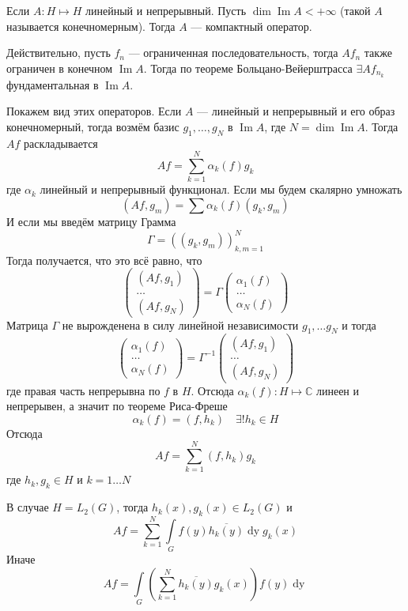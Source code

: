 \documentclass[12pt]{article}
\renewcommand{\Im}{\operatorname{Im}}
\begin{document}
\begin{Prim}
    Если $A : H \mapsto H$ линейный и непрерывный.
    Пусть $\dim \Im A < +\infty$ (такой $A$ называется конечномерным).
    Тогда $A$ --- компактный оператор.
    
    Действительно, пусть $f_n$ --- ограниченная последовательность, тогда
    $A f_n$ также ограничен в конечном $\Im A$.
    Тогда по теореме Больцано-Вейерштрасса $\exists A f_{n_k}$ фундаментальная
    в $\Im A$.
    
    Покажем вид этих операторов.
    Если $A$ --- линейный и непрерывный и его образ конечномерный, тогда возмём
    базис $g_1, \dots, g_N$ в $\Im A$, где $N = \dim \Im A$.
    Тогда $Af$ раскладывается
    $$
    Af = \sum\limits_{k = 1}^N\alpha_k(f)g_k
    $$
    где $\alpha_k$ линейный и непрерывный функционал.
    Если мы будем скалярно умножать
    $$
    (Af, g_m) = \sum \alpha_k(f) (g_k, g_m)
    $$
    И если мы введём матрицу Грамма
    $$
    \Gamma = ((g_k, g_m))_{k,m=1}^N
    $$
    Тогда получается, что это всё равно, что
    $$
    \left(
        \begin{array}{c}
            (Af, g_1)\\
            \dots\\
            (Af, g_N)
        \end{array}
    \right)
    =
    \Gamma \left(
        \begin{array}{c}
            \alpha_1(f)\\
            \dots\\
            \alpha_N(f)
        \end{array}
        \right)
    $$
    Матрица $\Gamma$ не вырожденена в силу линейной независимости 
    $g_1, \dots g_N$ и тогда
    $$
    \left(
        \begin{array}{c}
            \alpha_1(f)\\
            \dots\\
            \alpha_N(f)
        \end{array}
    \right)
    =
    \Gamma^{-1}\left(
        \begin{array}{c}
            (Af, g_1)\\
            \dots\\
            (Af, g_N)
        \end{array}
    \right)
    $$
    где правая часть непрерывна по $f$ в $H$.
    Отсюда $\alpha_k(f) : H \mapsto \mathbb C$ линеен и непрерывен, а значит
    по теореме Риса-Фреше
    $$
    \alpha_k(f) = (f, h_k)\quad \exists! h_k \in H
    $$
    Отсюда
    $$
    Af = \sum\limits_{k = 1}^N(f, h_k)g_k
    $$
    где $h_k, g_k \in H$ и $k = 1 \dots N$
\end{Prim}
\begin{Prim}
    В случае $H = L_2(G)$, тогда $h_k(x), g_k(x) \in L_2(G)$ и
    $$
    Af = \sum\limits_{k = 1}^N \int\limits_G f(y)\overline{h_k(y)} \mathop{dy} 
    g_k(x) 
    $$
    Иначе
    $$
    Af = \int\limits_G \left(\sum\limits_{k = 1}^N \overline{h_k(y)} g_k(x)
    \right) f(y)\mathop{dy}
    $$
\end{Prim}
\end{document}
